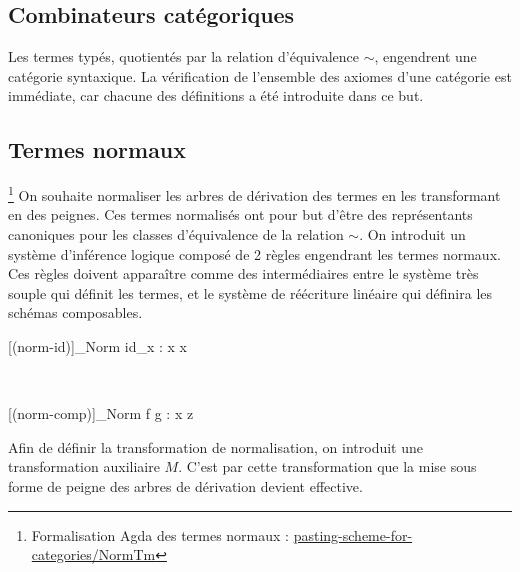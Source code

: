 \documentclass[conference]{IEEEtran}
\begin{document}
	\subsection{Combinateurs catégoriques}
	
	Les termes typés, quotientés par la relation d'équivalence $\sim$, engendrent une catégorie syntaxique. La vérification de l'ensemble des axiomes d'une catégorie est immédiate, car chacune des définitions a été introduite dans ce but.
	
	\subsection{Termes normaux}
	\footnote{Formalisation Agda des termes normaux : \href{https://github.com/ehouget/L3-ENS-Internship/tree/main/pasting-scheme-for-categories/NormTm}{pasting-scheme-for-categories/NormTm}}
	On souhaite normaliser les arbres de dérivation des termes en les transformant en des peignes. Ces termes normalisés ont pour but d'être des représentants canoniques pour les classes d'équivalence de la relation $\sim$. 
	On introduit un système d'inférence logique composé de 2 règles engendrant les termes normaux. Ces règles doivent apparaître comme des intermédiaires entre le système très souple qui définit les termes, et le système de réécriture linéaire qui définira les schémas composables.
	\vspace{10pt}
	\begin{center}
		\begin{prooftree}
			[(norm-id)]{\Gamma \vdash_{Norm} id_x : x \rightarrow x}
		\end{prooftree} \\
		\vspace{20pt}
		\begin{prooftree}
			\hypo[]{\Gamma \vdash_{Norm} f : x \rightarrow y}
			\hypo[]{g : y \rightarrow z \in \Gamma}
			[(norm-comp)]{\Gamma \vdash_{Norm} f \cdot g : x \rightarrow z}
		\end{prooftree}
	\end{center}
	\vspace{15pt}
	
	Afin de définir la transformation de normalisation, on introduit une transformation auxiliaire $M$. C'est par cette transformation que la mise sous forme de peigne des arbres de dérivation devient effective.
	
\end{document}
